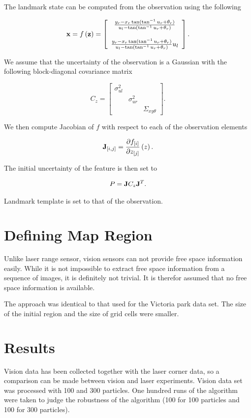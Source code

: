 The landmark state can be computed from the observation using the
following

$$
{\bf x} = f\left({\bf z}\right) 
= \left[\begin{array}{c}
\frac{y_r - x_r\tan(\tan^{-1} u_r+\theta_r)}{u_l-\tan(\tan^{-1} u_r+\theta_r) }\\
{}\\
\frac{y_r - x_r\tan(\tan^{-1} u_r+\theta_r)}{u_l-\tan(\tan^{-1} u_r+\theta_r)}u_l
\end{array}
\right].
$$

We assume that the uncertainty of the observation is a Gaussian with
the following block-diagonal covariance matrix

$$
C_z = \left[
  \begin{array}{ccc}
    \sigma^2_{ul} &             & \\
                & \sigma^2_{ur} & \\
                &             & \Sigma_{xy\theta}
  \end{array}
\right].
$$

We then compute Jacobian of $f$ with respect to each of the
observation elements

$$
{\bf J}_{[i,j]} = \frac{\partial f_{[i]}}
{\partial z_{[j]}}\left(z \right).
$$

The initial uncertainty of the feature is then set to

$$
P = {\bf J} C_z {\bf J}^T.
$$

Landmark template is set to that of the observation.

\section{Defining Map Region}

Unlike laser range sensor, vision sensors can not provide free space
information easily. While it is not impossible to extract free space
information from a sequence of images, it is definitely not
trivial. It is therefor assumed that no free space information is
available.

The approach was identical to that used for the Victoria park data
set. The size of the initial region and the size of grid cells were
smaller.

\section{Results}

Vision data has been collected together with the laser corner data, so
a comparison can be made between vision and laser experiments. Vision
data set was processed with 100 and 300 particles. One hundred runs of
the algorithm were taken to judge the robustness of the algorithm (100
for 100 particles and 100 for 300 particles).

